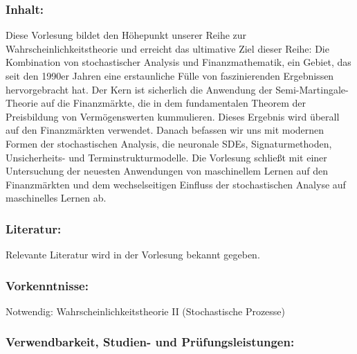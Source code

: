\documentclass[a4paper,10pt]{article}
\begin{document}
\subsubsection*{\large
    Inhalt:
}
Diese Vorlesung bildet den Höhepunkt unserer Reihe zur Wahrscheinlichkeitstheorie und erreicht das ultimative Ziel dieser Reihe: Die Kombination von stochastischer Analysis und Finanzmathematik, ein Gebiet, das seit den 1990er Jahren eine erstaunliche Fülle von faszinierenden Ergebnissen hervorgebracht hat. Der Kern ist sicherlich die Anwendung der Semi-Martingale-Theorie auf die Finanzmärkte, die in dem fundamentalen Theorem der Preisbildung von Vermögenswerten kummulieren. Dieses Ergebnis wird überall auf den Finanzmärkten verwendet. Danach befassen wir uns mit modernen Formen der stochastischen Analysis, die neuronale SDEs, Signaturmethoden, Unsicherheits- und Terminstrukturmodelle. Die Vorlesung schließt mit einer Untersuchung der neuesten Anwendungen von maschinellem Lernen auf den Finanzmärkten und dem wechselseitigen Einfluss der stochastischen Analyse auf maschinelles Lernen ab.
\subsubsection*{\large
    Literatur:
}
Relevante Literatur wird in der Vorlesung bekannt gegeben.
\subsubsection*{\large
    Vorkenntnisse:
}
Notwendig: Wahrscheinlichkeitstheorie II (Stochastische Prozesse)
\cleardoublepage
\subsubsection*{\large
    Verwendbarkeit, Studien- und Prüfungsleistungen:
}
\end{document}
